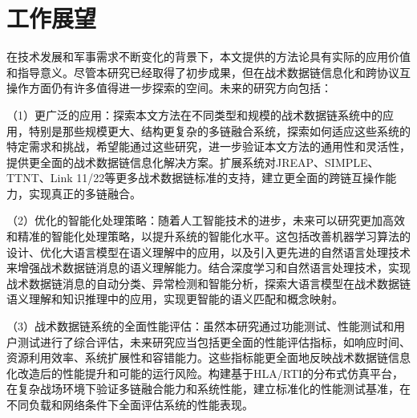 \section{工作展望}

在技术发展和军事需求不断变化的背景下，本文提供的方法论具有实际的应用价值和指导意义。尽管本研究已经取得了初步成果，但在战术数据链信息化和跨协议互操作方面仍有许多值得进一步探索的空间。未来的研究方向包括：

（1）更广泛的应用：探索本文方法在不同类型和规模的战术数据链系统中的应用，特别是那些规模更大、结构更复杂的多链融合系统，探索如何适应这些系统的特定需求和挑战，希望能通过这些研究，进一步验证本文方法的通用性和灵活性，提供更全面的战术数据链信息化解决方案。扩展系统对JREAP、SIMPLE、TTNT、Link 11/22等更多战术数据链标准的支持，建立更全面的跨链互操作能力，实现真正的多链融合。

（2）优化的智能化处理策略：随着人工智能技术的进步，未来可以研究更加高效和精准的智能化处理策略，以提升系统的智能化水平。这包括改善机器学习算法的设计、优化大语言模型在语义理解中的应用，以及引入更先进的自然语言处理技术来增强战术数据链消息的语义理解能力。结合深度学习和自然语言处理技术，实现战术数据链消息的自动分类、异常检测和智能分析，探索大语言模型在战术数据链语义理解和知识推理中的应用，实现更智能的语义匹配和概念映射。

（3）战术数据链系统的全面性能评估：虽然本研究通过功能测试、性能测试和用户测试进行了综合评估，未来研究应当包括更全面的性能评估指标，如响应时间、资源利用效率、系统扩展性和容错能力。这些指标能更全面地反映战术数据链信息化改造后的性能提升和可能的运行风险。构建基于HLA/RTI的分布式仿真平台，在复杂战场环境下验证多链融合能力和系统性能，建立标准化的性能测试基准，在不同负载和网络条件下全面评估系统的性能表现。


